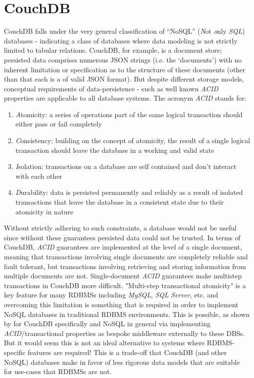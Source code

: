 \section{CouchDB}
CouchDB falls under the very general classification of ``NoSQL'' (\textit{N}ot \textit{o}nly \textit{SQL}) databases - indicating a class of databases where data modeling is not strictly limited to tabular relations. CouchDB, for example, is a document store; persisted data comprises numerous JSON strings (i.e. the `documents') with no inherent limitation or specification as to the structure of these documents (other than that each is a of valid JSON format). But despite different storage models, conceptual requirements of data-persistence - such as well known \textit{ACID} properties are applicable to all database systems. The acronym \textit{ACID} stands for:

\begin{enumerate}
    \item \textit{A}tomicity: a series of operations part of the same logical transaction should either pass or fail completely
    \item \textit{C}onsistency: building on the concept of atomicity, the result of a single logical transaction should leave the database in a working and valid state
    \item \textit{I}solation: transactions on a database are self contained and don't interact with each other
    \item \textit{D}urability: data is persisted permanently and reliably as a result of isolated transactions that leave the database in a consistent state due to their atomicity in nature
\end{enumerate}

Without strictly adhering to such constraints, a database would not be useful since without these guarantees persisted data could not be trusted. In terms of CouchDB, \textit{ACID} guarantees are implemented at the level of a single document, meaning that transactions involving single documents are completely reliable and fault tolerant, but transactions involving retrieving and storing information from multiple documents are not. Single-document \textit{ACID} guarantees make multistep transactions in CouchDB more difficult. "Multi-step transactional atomicity" is a key feature for many RDBMSs including \textit{MySQL}, \textit{SQL Server}, etc. and overcoming this limitation is something that is required in order to implement NoSQL databases in traditional RDBMS environments. This is possible, as shown by \cite{Rashmi2017} for CouchDB specifically and NoSQL in general \cite{LOTFY2016133} via implementing \textit{ACID}/transactional properties as bespoke middleware externally to these DBSs. But it would seem this is not an ideal alternative to systems where RDBMS-specific features are required! This is a trade-off that CouchDB (and other NoSQL) databases make in favor of less rigorous data models that are suitable for use-cases that RDBMSs are not.

